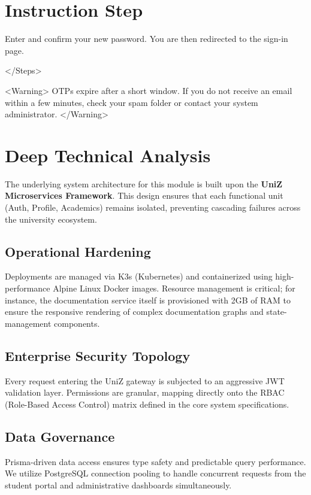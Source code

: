   
\section{Instruction Step}

    Enter and confirm your new password. You are then redirected to the sign-in
    page.
  
</Steps>

<Warning>
  OTPs expire after a short window. If you do not receive an email within a few
  minutes, check your spam folder or contact your system administrator.
</Warning>


\section{Deep Technical Analysis}
The underlying system architecture for this module is built upon the \textbf{UniZ Microservices Framework}. 
This design ensures that each functional unit (Auth, Profile, Academics) remains isolated, preventing cascading failures across the university ecosystem.

\subsection{Operational Hardening}
Deployments are managed via K3s (Kubernetes) and containerized using high-performance Alpine Linux Docker images. 
Resource management is critical; for instance, the documentation service itself is provisioned with 2GB of RAM to ensure the responsive rendering of complex documentation graphs and state-management components.

\subsection{Enterprise Security Topology}
Every request entering the UniZ gateway is subjected to an aggressive JWT validation layer. 
Permissions are granular, mapping directly onto the RBAC (Role-Based Access Control) matrix defined in the core system specifications.

\subsection{Data Governance}
Prisma-driven data access ensures type safety and predictable query performance. 
We utilize PostgreSQL connection pooling to handle concurrent requests from the student portal and administrative dashboards simultaneously.
